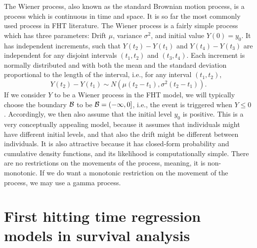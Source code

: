 The Wiener process, also known as the standard Brownian motion process, is a process which is continuous in time and space. It is so far the most commonly used process in FHT literature. The Wiener process is a fairly simple process which has three parameters: Drift $\mu$, variance $\sigma^2$, and initial value $Y(0)=y_0$. It has independent increments, such that $Y(t_2)-Y(t_1)$ and $Y(t_4)-Y(t_3)$ are independent for any disjoint intervals $(t_1,t_2)$ and $(t_3,t_4)$. Each increment is normally distributed and with both the mean and the standard deviation proportional to the length of the interval, i.e., for any interval $(t_1, t_2)$,
\begin{equation}
    Y(t_2)-Y(t_1)\sim N(\mu(t_2-t_1), \sigma^2(t_2-t_1)).
\end{equation}
If we consider $Y$ to be a Wiener process in the FHT model, we will typically choose the boundary $\mathcal{B}$ to be $\mathcal{B}=(-\infty,0]$, i.e., the event is triggered when $Y\leq0$. Accordingly, we then also assume that the initial level $y_0$ is positive. This is a very conceptually appealing model, because it assumes that individuals might have different initial levels, and that also the drift might be different between individuals. It is also attractive because it has closed-form probability and cumulative density functions, and its likelihood is computationally simple. There are no restrictions on the movements of the process, meaning, it is non-monotonic. If we do want a monotonic restriction on the movement of the process, we may use a gamma process.







\chapter{First hitting time regression models in survival analysis}

